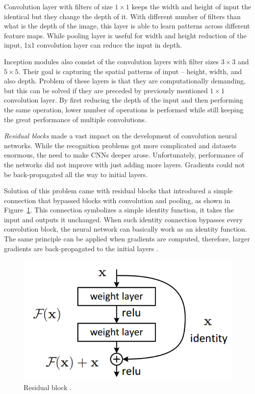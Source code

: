 Convolution layer with filters of size $1 \times 1$ keeps the width and height of input the identical but they change the depth of it. With different number of filters than what is the depth of the image, this layer is able to learn patterns across different feature maps. While pooling layer is useful for width and height reduction of the input, 1x1 convolution layer can reduce the input in depth.

Inception modules also consist of the convolution layers with filter sizes $3 \times 3$ and $5 \times 5$. Their goal is capturing the spatial patterns of input -- height, width, and also depth. Problem of these layers is that they are computationally demanding, but this can be solved if they are preceded by previously mentioned $1 \times 1$ convolution layer. By first reducing the depth of the input and then performing the same operation, lower number of operations is performed while still keeping the great performance of multiple convolutions.

\textit{Residual blocks} made a vast impact on the development of convolution neural networks. While the recognition problems got more complicated and datasets enormous, the need to make CNNs deeper arose. Unfortunately, performance of the networks did not improve with just adding more layers. Gradients could not be back-propagated all the way to initial layers.

Solution of this problem came with residual blocks that introduced a simple connection that bypassed blocks with convolution and pooling, as shown in Figure~\ref{fig:residual}. This connection symbolizes a simple identity function, it takes the input and outputs it unchanged. When such identity connection bypasses every convolution block, the neural network can basically work as an identity function. The same principle can be applied when gradients are computed, therefore, larger gradients are back-propagated to the initial layers \cite{he2015deep-resnet}.

\begin{figure}[ht]\centering
    \centering
    \includegraphics[scale=0.3]{figures/todo-residual.png}
    \caption{Residual block .}
    \label{fig:residual}
\end{figure}

